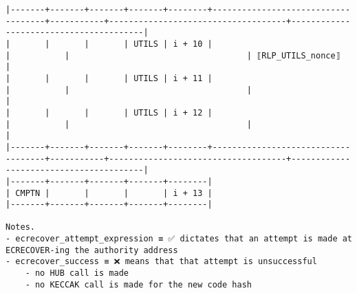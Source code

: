 \documentclass[varwidth=\maxdimen,margin=0.5cm,multi={verbatim}]{standalone}
\begin{document}
\begin{verbatim}
|-------+-------+-------+-------+--------+------------------------------------+-----------+------------------------------------+----------------------------------------|
|       |       |       | UTILS | i + 10 |                                    |           |                                    | ⟦RLP_UTILS_nonce⟧                      |
|       |       |       | UTILS | i + 11 |                                    |           |                                    |                                        |
|       |       |       | UTILS | i + 12 |                                    |           |                                    |                                        |
|-------+-------+-------+-------+--------+------------------------------------+-----------+------------------------------------+----------------------------------------|
|-------+-------+-------+-------+--------|
| CMPTN |       |       |       | i + 13 |
|-------+-------+-------+-------+--------|

Notes.
- ecrecover_attempt_expression ≡ ✅ dictates that an attempt is made at ECRECOVER-ing the authority address
- ecrecover_success ≡ ❌ means that that attempt is unsuccessful
	- no HUB call is made
	- no KECCAK call is made for the new code hash

\end{verbatim}
\end{document}

